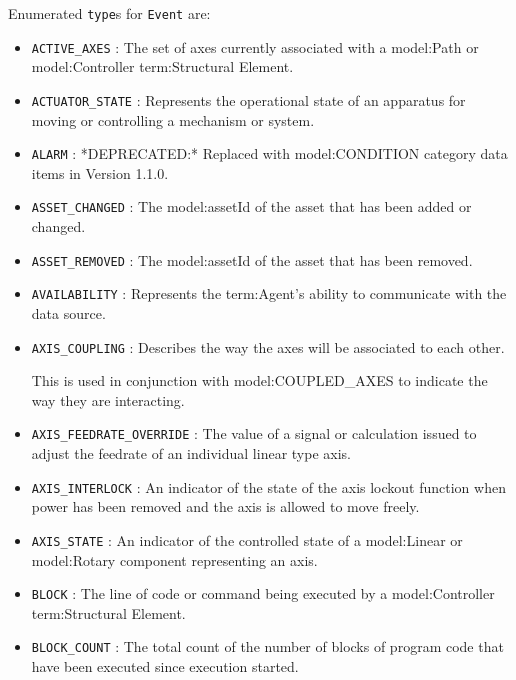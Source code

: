  Enumerated \texttt{type}s for \texttt{Event} are:
\begin{itemize}

\item \texttt{ACTIVE_AXES} : The set of axes currently associated with a {model:Path} or {model:Controller} {term:Structural Element}. 

\item \texttt{ACTUATOR_STATE} : Represents the operational state of an apparatus for moving or controlling a mechanism or system. 

\item \texttt{ALARM} : *DEPRECATED:* Replaced with {model:CONDITION} category data items in Version 1.1.0. 

\item \texttt{ASSET_CHANGED} : The {model:assetId} of the asset that has been added or changed. 

\item \texttt{ASSET_REMOVED} : The {model:assetId} of the asset that has been removed. 

\item \texttt{AVAILABILITY} : Represents the {term:Agent}'s ability to communicate with the data source. 

\item \texttt{AXIS_COUPLING} : Describes the way the axes will be associated to each other. 
  
This is used in conjunction with {model:COUPLED_AXES} to indicate the way they are interacting. 

\item \texttt{AXIS_FEEDRATE_OVERRIDE} : The value of a signal or calculation issued to adjust the feedrate of an individual linear type axis. 

\item \texttt{AXIS_INTERLOCK} : An indicator of the state of the axis lockout function when power has been removed and the axis is allowed to move freely. 

\item \texttt{AXIS_STATE} : An indicator of the controlled state of a {model:Linear} or {model:Rotary} component representing an axis. 

\item \texttt{BLOCK} : The line of code or command being executed by a {model:Controller} {term:Structural Element}. 

\item \texttt{BLOCK_COUNT} : The total count of the number of blocks of program code that have been executed since execution started. 


\end{itemize}
